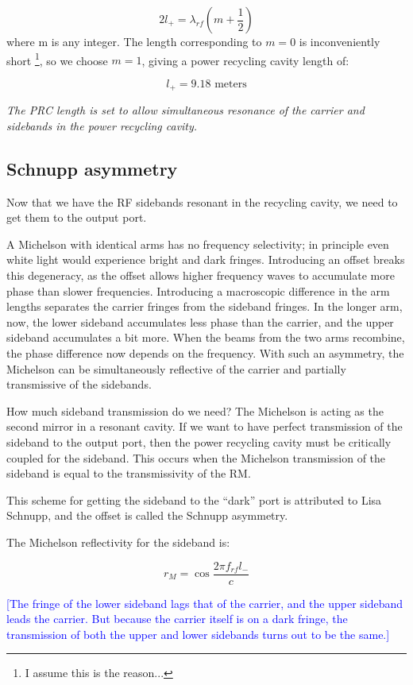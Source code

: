 \[
2l_{+}=\lambda_{rf}\left(m+\frac{1}{2}\right)
\]
where m is any integer. The length corresponding to $m=0$ is inconveniently
short%
\footnote{I assume this is the reason...%
}, so we choose $m=1$, giving a power recycling cavity length of:

\[
\boxed{{l_{+}=9.18\text{{\ meters}}}}
\]


\emph{The PRC length is set to allow simultaneous resonance of the
carrier and sidebands in the power recycling cavity.}


\subsection*{Schnupp asymmetry}

Now that we have the RF sidebands resonant in the recycling cavity,
we need to get them to the output port. 

A Michelson with identical arms has no frequency selectivity; in principle
even white light would experience bright and dark fringes. Introducing
an offset breaks this degeneracy, as the offset allows higher frequency
waves to accumulate more phase than slower frequencies. Introducing
a macroscopic difference in the arm lengths separates the carrier
fringes from the sideband fringes. In the longer arm, now, the lower
sideband accumulates less phase than the carrier, and the upper sideband
accumulates a bit more. When the beams from the two arms recombine,
the phase difference now depends on the frequency. With such an asymmetry,
the Michelson can be simultaneously reflective of the carrier and
partially transmissive of the sidebands. 

How much sideband transmission do we need? The Michelson is acting
as the second mirror in a resonant cavity. If we want to have perfect
transmission of the sideband to the output port, then the power recycling
cavity must be critically coupled for the sideband. This occurs when
the Michelson transmission of the sideband is equal to the transmissivity
of the RM.

This scheme for getting the sideband to the {}``dark'' port is attributed
to Lisa Schnupp, and the offset is called the Schnupp asymmetry.

The Michelson reflectivity for the sideband is:

\[
r_{M}=\cos\frac{2\pi f_{rf}l_{-}}{c}
\]


\textcolor{blue}{{[}The fringe of the lower sideband lags that of
the carrier, and the upper sideband leads the carrier. But because
the carrier itself is on a dark fringe, the transmission of both the
upper and lower sidebands turns out to be the same.{]}}

